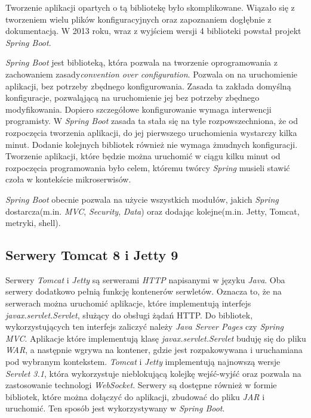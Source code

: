 Tworzenie aplikacji opartych o tą bibliotekę było skomplikowane. Wiązało się z tworzeniem wielu plików konfiguracyjnych oraz zapoznaniem dogłębnie z dokumentacją. W 2013 roku, wraz z wyjściem wersji 4 biblioteki powstał projekt \textsl{Spring Boot}. 

\textsl{Spring Boot} jest biblioteką, która pozwala na tworzenie oprogramowania z zachowaniem zasady\textsl{convention over configuration}. Pozwala on na uruchomienie aplikacji, bez potrzeby zbędnego konfigurowania. Zasada ta zakłada domyślną konfiguracje, pozwaląjącą na uruchomienie jej bez potrzeby zbędnego modyfikowania. Dopiero szczegółowe konfigurowanie wymaga interwencji programisty. W \textsl{Spring Boot} zasada ta stała się na tyle rozpowszechniona, że od rozpoczęcia tworzenia aplikacji, do jej pierwszego uruchomienia wystarczy kilka minut. Dodanie kolejnych bibliotek również nie wymaga żmudnych konfiguracji. Tworzenie aplikacji, które będzie można uruchomić w ciągu kilku minut od rozpoczęcia programowania było celem, któremu twórcy \textsl{Spring} musieli stawić czoła w kontekście mikroserwisów. 

\textsl{Spring Boot} obecnie pozwala na użycie wszystkich modułów, jakich \textsl{Spring} dostarcza(m.in. \textsl{MVC}, \textsl{Security}, \textsl{Data}) oraz dodając kolejne(m.in. Jetty, Tomcat, metryki, shell). 

\subsection{Serwery Tomcat 8 i Jetty 9} 
Serwery \textsl{Tomcat} i \textsl{Jetty} są serwerami \textsl{HTTP} napisanymi w języku \textsl{Java}. Oba serwery dodatkowo pełnią funkcję kontenerów serwletów. Oznacza to, że na serwerach można uruchomić aplikacje, które implementują interfejs \textsl{javax.servlet.Servlet}, służący do obsługi żądań HTTP. Do bibliotek, wykorzystujących ten interfejs zaliczyć należy \textsl{Java Server Pages} czy \textsl{Spring MVC}. Aplikacje które implementują klasę \textsl{javax.servlet.Servlet} buduję się do pliku \textsl{WAR}, a następnie wgrywa na kontener, gdzie jest rozpakowywana i uruchamiana pod wybranym kontekstem. \textsl{Tomcat} i \textsl{Jetty} implementują najnowszą wersje \textsl{Servlet 3.1}, która wykorzystuje nieblokującą kolejkę wejść-wyjść oraz pozwala na zastosowanie technologi \textsl{WebSocket}. Serwery są dostępne również w formie bibliotek, które można dołączyć do aplikacji, zbudować do pliku \textsl{JAR} i uruchomić. Ten sposób jest wykorzystywany w \textsl{Spring Boot}.

